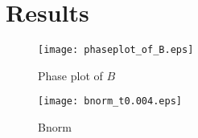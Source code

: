 \chapter{Results} \label{sec:results}


\begin{figure}[t]
    \centering
    \texttt{[image: phaseplot\_of\_B.eps]}
    \caption{Phase plot of $B$}
    \label{fig:phaseplot_of_B}
\end{figure}



\begin{figure}[t]
    \centering
    \texttt{[image: bnorm\_t0.004.eps]}
    \caption{Bnorm}
    \label{fig:bnorm}
\end{figure}